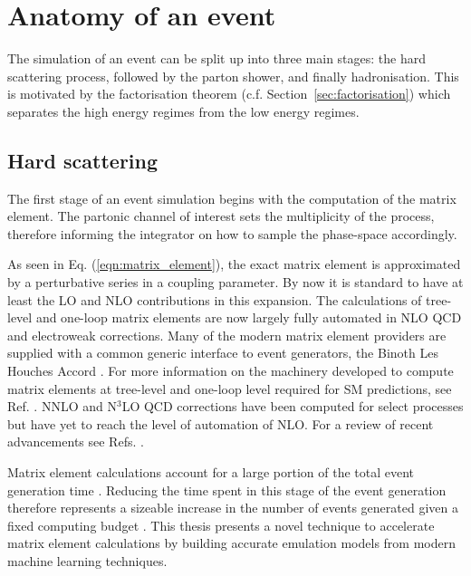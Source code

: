 \documentclass[main.tex]{subfiles}
\begin{document}
    \section{Anatomy of an event}\label{sec:anatomy_event}
    The simulation of an event can be split up into three
    main stages: the hard scattering process, followed by
    the parton shower, and finally hadronisation.
    This is motivated by the factorisation theorem (c.f. Section~\ref{sec:factorisation})
    which separates the high energy regimes from the low
    energy regimes.

    \subsection*{Hard scattering}\label{sec:me_generators}
    The first stage of an event simulation begins with
    the computation of the matrix element. The partonic
    channel of interest sets the multiplicity of the process,
    therefore informing the integrator on how to sample the phase-space
    accordingly.

    As seen in Eq. (\ref{eqn:matrix_element}),
    the exact matrix element is approximated by a perturbative
    series in a coupling parameter. By now it is standard to
    have at least the LO and NLO contributions in this expansion.
    The calculations of
    tree-level \cite{Mangano:2002ea,Krauss:2001iv,Gleisberg:2008fv,Cafarella:2007pc,Alwall:2011uj,Kilian:2007gr}
    and one-loop \cite{Berger:2008sj,Cullen:2011ac,Cullen:2014yla,Bevilacqua:2011xh,Hirschi:2011pa,Alwall:2014hca,Frederix:2018nkq,Campbell:1999ah,Campbell:2021vlt,Badger:2012pg,Cascioli:2011va,Buccioni:2019sur,Actis:2016mpe,Denner:2017wsf}
    matrix elements are now largely fully automated
    in NLO QCD and electroweak corrections.
    Many of the modern matrix element providers are supplied
    with a common generic interface to event generators,
    the Binoth Les Houches Accord \cite{Binoth:2010xt,Alioli:2013nda}.
    For more information on the machinery developed to
    compute matrix elements at tree-level and
    one-loop level required for SM predictions, see Ref. \cite{Campbell:2017hsr}.
    NNLO and N$^{3}$LO QCD corrections have been computed
    for select processes but have yet to reach the
    level of automation of NLO.
    For a review of recent advancements see Refs. \cite{Caola:2022ayt,Campbell:2022qmc}.
    
    Matrix element calculations account for a large
    portion of the total event generation time \cite{Bothmann:2022thx}.
    Reducing the time spent in this stage of the event
    generation therefore represents a sizeable increase
    in the number of events generated given a fixed computing
    budget \cite{HSFPhysicsEventGeneratorWG:2020gxw}.
    This thesis presents a novel technique to
    accelerate matrix element calculations by building
    accurate emulation models from modern machine learning
    techniques.
\end{document}
